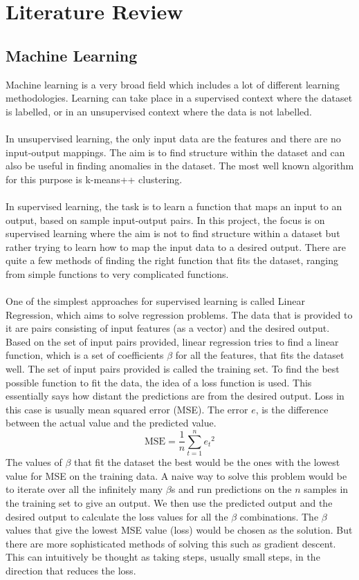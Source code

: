 \documentclass[12pt]{article}
\begin{document}
\section{Literature Review}
\subsection{Machine Learning}\label{subsec:ml}
Machine learning is a very broad field which includes a lot of different learning methodologies. Learning can take place in a supervised context where the dataset is labelled, or in an unsupervised context where the data is not labelled. 
\\\\
In unsupervised learning, the only input data are the features and there are no input-output mappings. The aim is to find structure within the dataset and can also be useful in finding anomalies in the dataset. The most well known algorithm for this purpose is k-means++ clustering.
\\\\
In supervised learning, the task is to learn a function that maps an input to an output, based on sample input-output pairs. In this project, the focus is on supervised learning where the aim is not to find structure within a dataset but rather trying to learn how to map the input data to a desired output. There are quite a few methods of finding the right function that fits the dataset, ranging from simple functions to very complicated functions.
\\\\
One of the simplest approaches for supervised learning is called Linear Regression, which aims to solve regression problems. The data that is provided to it are pairs consisting of input features (as a vector) and the desired output. Based on the set of input pairs provided, linear regression tries to find a linear function, which is a set of coefficients $\beta$ for all the features, that fits the dataset well. The set of input pairs provided is called the training set. To find the best possible function to fit the data, the idea of a loss function is used. This essentially says how distant the predictions are from the desired output. Loss in this case is usually mean squared error (MSE). The error $e$, is the difference between the actual value and the predicted value.
$$\mbox{MSE} = \frac{1}{n}\sum_{t=1}^{n}{e_t}^2$$
The values of $\beta$ that fit the dataset the best would be the ones with the lowest value for MSE on the training data. A naive way to solve this problem would be to iterate over all the infinitely many $\beta$s and run predictions on the $n$ samples in the training set to give an output. We then use the predicted output and the desired output to calculate the loss values for all the $\beta$ combinations. The $\beta$ values that give the lowest MSE value (loss) would be chosen as the solution. But there are more sophisticated methods of solving this such as gradient descent. This can intuitively be thought as taking steps, usually small steps, in the direction that reduces the loss. 
\end{document}
